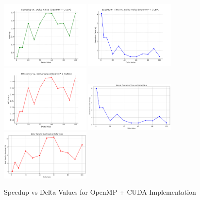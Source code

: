 \documentclass{article}
\begin{document}
\begin{figure}[h]
    \centering
    \includegraphics[width=0.4\textwidth]{speedup_vs_delta.png}
    \includegraphics[width=0.4\textwidth]{execution_time_vs_delta.png}
    \includegraphics[width=0.4\textwidth]{efficiency_vs_delta.png}
    \includegraphics[width=0.4\textwidth]{KernelTime.png}
    \includegraphics[width=0.4\textwidth]{kernelOverhead.png}

    \caption{Speedup vs Delta Values for OpenMP + CUDA Implementation}
    \label{fig:speedup_openmp_cuda}
\end{figure}
\end{document}
